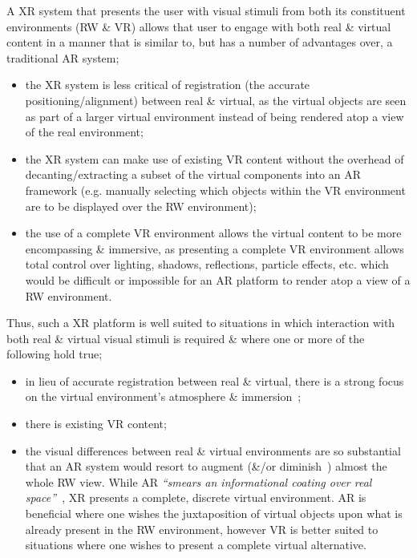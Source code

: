 \documentclass[oneside]{book}
\begin{document}
A XR system that presents the user with visual stimuli from both its constituent environments (RW \& VR) allows that user to engage with both real \& virtual content in a manner that is similar to, but has a number of advantages over, a traditional AR system;

\begin{itemize}
	\item the XR system is less critical of registration (the accurate positioning/alignment) between real \& virtual, as the virtual objects are seen as part of a larger virtual environment instead of being rendered atop a view of the real environment;
	\item the XR system can make use of existing VR content without the overhead of decanting/extracting a subset of the virtual components into an AR framework (e.g. manually selecting which objects within the VR environment are to be displayed over the RW environment);
	\item the use of a complete VR environment allows the virtual content to be more encompassing \& immersive, as presenting a complete VR environment allows total control over lighting, shadows, reflections, particle effects, etc. which would be difficult or impossible for an AR platform to render atop a view of a RW environment.
\end{itemize}

Thus, such a XR platform is well suited to situations in which interaction with both real \& virtual visual stimuli is required \& where one or more of the following hold true;

\begin{itemize}
	\item in lieu of accurate registration between real \& virtual, there is a strong focus on the virtual environment's atmosphere \& immersion~\cite{deamicis:gamebased};
	\item there is existing VR content;
	\item the visual differences between real \& virtual environments are so substantial that an AR system would resort to augment (\&/or diminish~\cite{Mann2002}) almost the whole RW view. While AR \textit{``smears an informational coating over real space''}~\cite{Andersen}, XR presents a complete, discrete virtual environment. AR is beneficial where one wishes the juxtaposition of virtual objects upon what is already present in the RW environment, however VR is better suited to situations where one wishes to present a complete virtual alternative.
\end{itemize}
\end{document}
